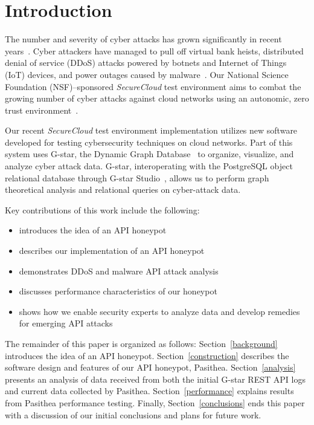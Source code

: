 
\section{Introduction} \label{intro}

The number and severity of cyber attacks has grown significantly in recent years~\cite{Symantec-Threat-Report,IBM-XForce-Report}. 
Cyber attackers have managed to pull off virtual bank heists, distributed denial of service (DDoS) attacks powered by botnets and Internet of Things (IoT) devices, and power outages caused by malware~\cite{IBM-XForce-Report}. 
Our National Science Foundation (NSF)--sponsored {\em SecureCloud} test environment aims to combat the growing number of cyber attacks against cloud networks using an autonomic, zero trust environment~\cite{7796146}.  

Our recent {\em SecureCloud} test environment implementation utilizes new software developed for testing cybersecurity techniques on cloud networks.
Part of this system uses G-star, the Dynamic Graph Database~\cite{Labouseur-DAPD-2015} to organize, visualize, and analyze cyber attack data. 
G-star, interoperating with the PostgreSQL object relational database through G-star Studio~\cite{inroads-Labouseur16}, allows us to perform graph theoretical analysis and relational queries on cyber-attack data.  

Key contributions of this work include the following:
\begin{itemize}
      \setlength{\itemsep}{1pt}
      \setlength{\parskip}{0pt}
      \setlength{\parsep}{0pt}
   \item introduces the idea of an API honeypot
   \item describes our implementation of an API honeypot
   \item demonstrates DDoS and malware API attack analysis
   \item discusses performance characteristics of our honeypot
   \item shows how we enable security experts to analyze data and develop remedies for emerging API attacks  
\end{itemize}

The remainder of this paper is organized as follows: 
Section~\ref{background} introduces the idea of an API honeypot. 
Section~\ref{construction} describes the software design and features of our API honeypot, Pasithea. 
Section~\ref{analysis} presents an analysis of data received from both the initial G-star REST API logs and current data collected by Pasithea. 
Section~\ref{performance} explains results from Pasithea performance testing.
Finally, Section~\ref{conclusions} ends this paper with a discussion of our initial conclusions and plans for future work.
